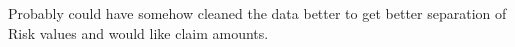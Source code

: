 Probably could have somehow cleaned the data better to get better separation of Risk values and would like claim amounts.